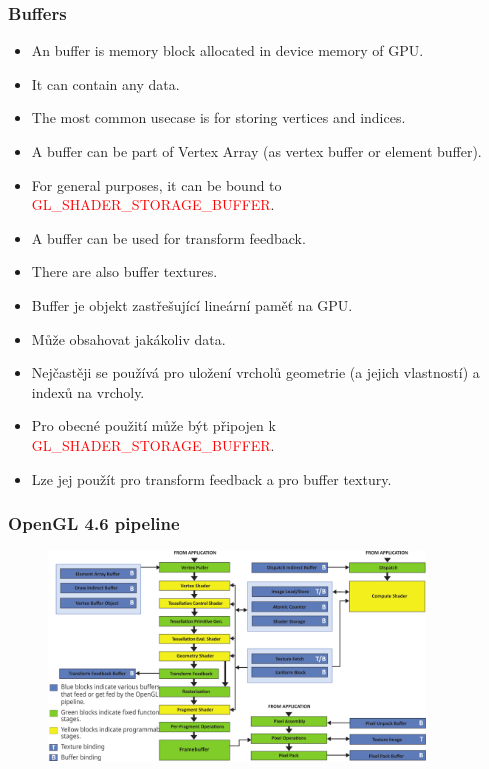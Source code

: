 
\begin{frame}\frametitle{Buffers}
\scriptsize
\begin{itemize}
\item An buffer is memory block allocated in device memory of GPU.
\item It can contain any data.
\item The most common usecase is for storing vertices and indices.
\item A buffer can be part of Vertex Array (as vertex buffer or element buffer).
\item For general purposes, it can be bound to \textcolor{red}{GL\_SHADER\_STORAGE\_BUFFER}.
\item A buffer can be used for transform feedback.
\item There are also buffer textures.
\end{itemize}

\begin{itemize}
\item Buffer je objekt zastřešující lineární paměť na GPU.
\item Může obsahovat jakákoliv data.
\item Nejčastěji se používá pro uložení vrcholů geometrie (a jejich vlastností) a indexů na vrcholy.
\item Pro obecné použití může být připojen k \textcolor{red}{GL\_SHADER\_STORAGE\_BUFFER}.
\item Lze jej použít pro transform feedback a pro buffer textury.
\end{itemize}
\end{frame}

\begin{frame}
\frametitle{OpenGL 4.6 pipeline}
  \begin{figure}[h]
  \includegraphics[width=10cm,keepaspectratio]{pics/pipeline/OpenGL460Pipeline}
  \end{figure}
\end{frame}

